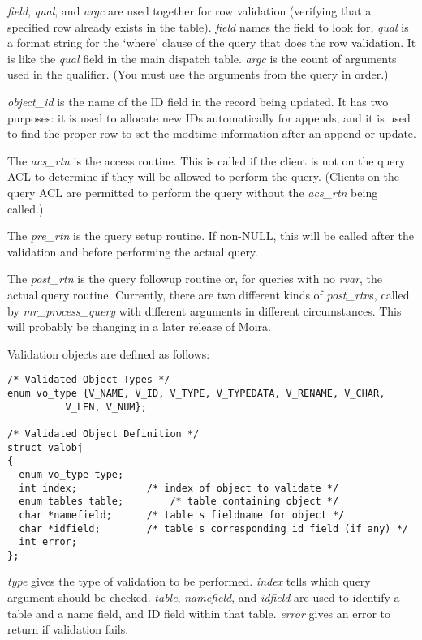 {\it field}, {\it qual}, and {\it argc\/} are used together for row
validation (verifying that a specified row already exists in the
table). {\it field\/} names the field to look for, {\it qual\/} is a
format string for the `where' clause of the query that does the row
validation. It is like the {\it qual\/} field in the main dispatch
table. {\it argc\/} is the count of arguments used in the qualifier.
(You must use the arguments from the query in order.)

{\it object\_id\/} is the name of the ID field in the record being updated.
It has two purposes:  it is used to allocate new IDs automatically
for appends, and it is used to find the proper row to set the modtime
information after an append or update.

The {\it acs\_rtn\/} is the access routine. This is called if the
client is not on the query ACL to determine if they will be allowed to
perform the query. (Clients on the query ACL are permitted to perform
the query without the {\it acs\_rtn\/} being called.)

The {\it pre\_rtn\/} is the query setup routine. If non-NULL, this
will be called after the validation and before performing the actual
query.

The {\it post\_rtn\/} is the query followup routine or, for queries
with no {\it rvar\/}, the actual query routine. Currently, there are
two different kinds of {\it post\_rtn\/}s, called by {\it
mr\_process\_query} with different arguments in different
circumstances. This will probably be changing in a later release of
Moira.

\bigskip

\noindent Validation objects are defined as follows:

\begin{verbatim}
/* Validated Object Types */
enum vo_type {V_NAME, V_ID, V_TYPE, V_TYPEDATA, V_RENAME, V_CHAR,
	      V_LEN, V_NUM};

/* Validated Object Definition */
struct valobj
{
  enum vo_type type;
  int index;			/* index of object to validate */
  enum tables table;     	/* table containing object */
  char *namefield;		/* table's fieldname for object */
  char *idfield;		/* table's corresponding id field (if any) */
  int error;
};
\end{verbatim}

{\it type\/} gives the type of validation to be performed. {\it
index\/} tells which query argument should be checked. {\it table},
{\it namefield}, and {\it idfield\/} are used to identify a table and
a name field, and ID field within that table. {\it error\/} gives an
error to return if validation fails.

